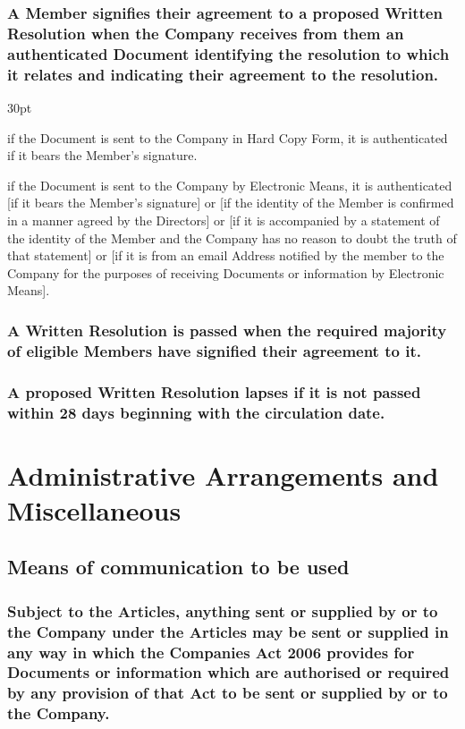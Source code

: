 \documentclass[12pt]{article}
\def\clauseindent{30pt}
\newenvironment{subindentpara}{\raggedright\begin{adjustwidth}{\clauseindent}{}\begin{hanginglist}}{\end{hanginglist}\end{adjustwidth}}
\begin{document}
\subsubsection[Responses to Written Resolutions]{A Member signifies their agreement to a proposed Written Resolution when the Company receives from them an authenticated Document identifying the resolution to which it relates and indicating their agreement to the resolution.}
\begin{subindentpara}
    \item if the Document is sent to the Company in Hard Copy Form, it is authenticated if it bears the Member's signature.
    \item if the Document is sent to the Company by Electronic Means, it is authenticated [if it bears the Member's signature] or [if the identity of the Member is confirmed in a manner agreed by the Directors] or [if it is accompanied by a statement of the identity of the Member and the Company has no reason to doubt the truth of that statement] or [if it is from an email Address notified by the member to the Company for the purposes of receiving Documents or information by Electronic Means].
\end{subindentpara}
\subsubsection[Passing of Written Resolutions]{A Written Resolution is passed when the required majority of eligible Members have signified their agreement to it.}
\subsubsection[Lapsing of Written Resolutions]{A proposed Written Resolution lapses if it is not passed within 28 days beginning with the circulation date.}

\newpage\section*{Administrative Arrangements and Miscellaneous}

\subsection{Means of communication to be used}
\subsubsection[Specifics of communication to be used]{Subject to the Articles, anything sent or supplied by or to the Company under the Articles may be sent or supplied in any way in which the Companies Act 2006 provides for Documents or information which are authorised or required by any provision of that Act to be sent or supplied by or to the Company.}
\end{document}
